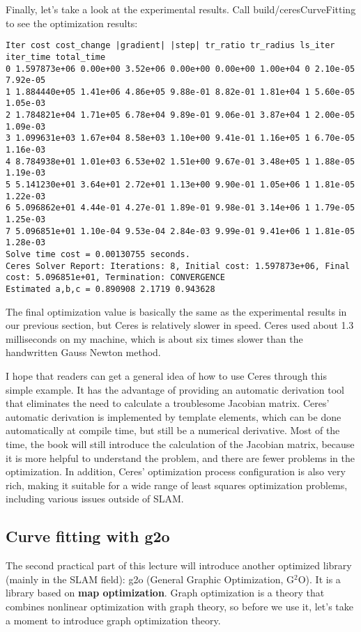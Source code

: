 Finally, let's take a look at the experimental results. Call build/ceresCurveFitting to see the optimization results:
\begin{lstlisting}
Iter cost cost_change |gradient| |step| tr_ratio tr_radius ls_iter iter_time total_time
0 1.597873e+06 0.00e+00 3.52e+06 0.00e+00 0.00e+00 1.00e+04 0 2.10e-05 7.92e-05
1 1.884440e+05 1.41e+06 4.86e+05 9.88e-01 8.82e-01 1.81e+04 1 5.60e-05 1.05e-03
2 1.784821e+04 1.71e+05 6.78e+04 9.89e-01 9.06e-01 3.87e+04 1 2.00e-05 1.09e-03
3 1.099631e+03 1.67e+04 8.58e+03 1.10e+00 9.41e-01 1.16e+05 1 6.70e-05 1.16e-03
4 8.784938e+01 1.01e+03 6.53e+02 1.51e+00 9.67e-01 3.48e+05 1 1.88e-05 1.19e-03
5 5.141230e+01 3.64e+01 2.72e+01 1.13e+00 9.90e-01 1.05e+06 1 1.81e-05 1.22e-03
6 5.096862e+01 4.44e-01 4.27e-01 1.89e-01 9.98e-01 3.14e+06 1 1.79e-05 1.25e-03
7 5.096851e+01 1.10e-04 9.53e-04 2.84e-03 9.99e-01 9.41e+06 1 1.81e-05 1.28e-03
Solve time cost = 0.00130755 seconds.
Ceres Solver Report: Iterations: 8, Initial cost: 1.597873e+06, Final cost: 5.096851e+01, Termination: CONVERGENCE
Estimated a,b,c = 0.890908 2.1719 0.943628
\end{lstlisting}

The final optimization value is basically the same as the experimental results in our previous section, but Ceres is relatively slower in speed. Ceres used about 1.3 milliseconds on my machine, which is about six times slower than the handwritten Gauss Newton method.

I hope that readers can get a general idea of ​​how to use Ceres through this simple example. It has the advantage of providing an automatic derivation tool that eliminates the need to calculate a troublesome Jacobian matrix. Ceres' automatic derivation is implemented by template elements, which can be done automatically at compile time, but still be a numerical derivative. Most of the time, the book will still introduce the calculation of the Jacobian matrix, because it is more helpful to understand the problem, and there are fewer problems in the optimization. In addition, Ceres' optimization process configuration is also very rich, making it suitable for a wide range of least squares optimization problems, including various issues outside of SLAM.

\subsection{Curve fitting with g2o}
The second practical part of this lecture will introduce another optimized library (mainly in the SLAM field): g2o (General Graphic Optimization, G$^2$O). It is a library based on \textbf{map optimization}. Graph optimization is a theory that combines nonlinear optimization with graph theory, so before we use it, let's take a moment to introduce graph optimization theory.

